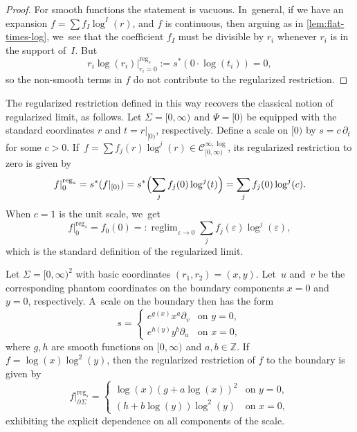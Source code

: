\documentclass[JEP,XML,SOM,Unicode,NoFloatCountersInSection,published]{cedram}
\newcommand{\rBrac}[1]{\Bigl(#1\Bigr)}
\theoremstyle{definition}
\theoremstyle{remark}
\newenvironment{example}
  {\pushQED{\qed}\renewcommand{\qedsymbol}{$\lozenge$}\examplex}
  {\popQED\endexamplex}
\newcommand{\ZZ}{\mathbb{Z}}
\newcommand{\halfspc}[1]{[0,\infty)^{#1}}
\let\epsilon\varepsilon
\newcommand{\Cinflog}[1]{\mathscr{C}^{\infty,\log}_{#1}}
\newcommand{\cvf}[1]{\partial_{#1}}
\newcommand{\reg}[1][]{\mathrm{reg}_{#1}}
\DeclareMathOperator{\reglim}{reglim}
\newcommand{\Sig}{\Sigma}
\newcommand{\bdSig}[1][]{\partial^{#1}\Sigma}
\begin{document}
\begin{proof}
For smooth functions the statement is vacuous. In~general, if we have an expansion $f = \sum f_I\log^I(r)$, and $f$ is continuous, then arguing as in \autoref{lem:flat-times-log}, we~see that the coefficient $f_I$ must be divisible by $r_i$ whenever $r_i$ is in the support of~$I$. But\vspace*{-3pt}
\[
r_i\log(r_i)|^{\reg[s]}_{r_i=0} := s^*(0 \cdot \log(t_i)) = 0,
\]
so the non-smooth terms in $f$ do not contribute to the regularized restriction.
\end{proof}

The regularized restriction defined in this way recovers the classical notion of regularized limit, as follows.
\begin{example}
Let $\Sig = \halfspc{}$ and $\Psi = [0)$ be equipped with the standard coordinates $r$ and $t = r|_{[0)}$, respectively. Define a scale on $[0)$ by $s = c \,\cvf{t}$ for some $c>0$. If~$f = \sum f_j(r)\log^j(r) \in \Cinflog{\halfspc{}}$, its regularized restriction to zero is given by\vspace*{-3pt}
\[
f|^{\reg[s]}_0 = s^*(f|_{[0)}) = s^*\rBrac{\sum_j f_j(0)\log^j(t)} = \sum_j f_j(0)\log^j(c).
\]
When $c= 1$ is the unit scale, we~get\vspace*{-3pt}
\[
f|^{\reg[s]}_0 = f_0(0) =: \reglim_{\epsilon \to 0} \sum_j f_j(\epsilon)\log^j(\epsilon),
\]
which is the standard definition of the regularized limit.
\end{example}

\begin{example}
Let $\Sig = \halfspc{2}$ with basic coordinates $(r_1,r_2)=(x,y)$. Let~$u$ and~$v$ be the corresponding phantom coordinates on the boundary components $x=0$ and $y=0$, respectively. A~scale on the boundary then has the form\vspace*{-3pt}
\[
s =
\begin{cases}
e^{g(x)} x^a \cvf{v} & \textrm{on } y=0, \\
e^{h(y)} y^b \cvf{u} &\textrm{on } x=0,
\end{cases}
\]
where $g,h$ are smooth functions on $\halfspc{}$ and $a,b \in \ZZ$. If~$f = \log(x)\log^2(y)$, then the regularized restriction of $f$ to the boundary is given by\vspace*{-3pt}
\[
f|^{\reg[s]}_{\bdSig} = \begin{cases}
\log(x)(g+a\log(x))^2 &\textrm{on }y=0, \\
(h+b\log(y))\log^2(y) & \textrm{on } x=0,
\end{cases}
\]
exhibiting the explicit dependence on all components of the scale.
\end{example}
\end{document}
